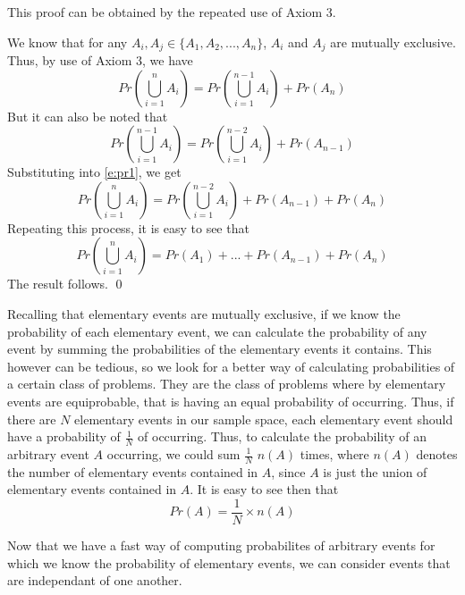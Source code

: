 \begin{prf}
This proof can be obtained by the repeated use of Axiom 3.

We know that for any $A_i, A_j \in \{A_1, A_2, ... , A_n\}$,
$A_i$ and $A_j$ are mutually exclusive.
Thus, by use of Axiom 3, we have 
\begin{equation} \label{e:pr1}
Pr\left(\bigcup _{i=1} ^n A_i\right) = Pr\left(\bigcup _{i=1} ^{n-1} A_i\right) + Pr(A_n)
\end{equation}
But it can also be noted that 
\begin{equation}
Pr\left(\bigcup _{i=1} ^{n-1} A_i\right) = Pr\left(\bigcup _{i=1} ^{n-2} A_i\right) + Pr(A_{n-1})
\end{equation}
Substituting into \ref{e:pr1}, we get
\begin{equation}
Pr\left(\bigcup _{i=1} ^n A_i\right) = Pr\left(\bigcup _{i=1} ^{n-2} A_i\right) + Pr(A_{n-1}) + Pr(A_n)
\end{equation}
Repeating this process, it is easy to see that
\begin{equation} 
Pr\left(\bigcup _{i=1} ^n A_i\right) = Pr(A_{1}) + ... + Pr(A_{n-1}) + Pr(A_n)
\end{equation}
The result follows. \qed
\end{prf}

Recalling that elementary events are mutually exclusive, if we know the
probability of each elementary event, we can calculate the probability of any
event by summing the probabilities of the elementary events it contains. This
however can be tedious, so we look for a better way of calculating
probabilities of a certain class of problems. They are the class of problems
where by elementary events are equiprobable, that is having an equal
probability of occurring. Thus, if there are $N$ elementary events in our
sample space, each elementary event should have a probability of $\frac{1}{N}$
of occurring. Thus, to calculate the probability of an arbitrary event $A$
occurring, we could sum $\frac{1}{N}$ $n(A)$ times, where $n(A)$ denotes the
number of elementary events contained in $A$, since $A$ is just the union of
elementary events contained in $A$. It is easy to see then that
\begin{equation}
Pr(A) = \frac{1}{N} \times n(A)
\end{equation}

Now that we have a fast way of computing probabilites of arbitrary events
for which we know the probability of elementary events, we can consider
events that are independant of one another.

